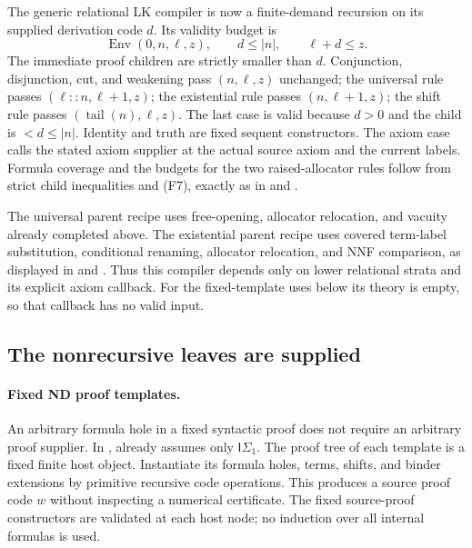The generic relational LK compiler is now a finite-demand recursion
on its supplied derivation code $d$.  Its validity budget is
\[
 \operatorname{Env}(0,n,\ell,z),\qquad d\le|n|,
 \qquad \ell+d\le z.
 \tag{F7}
\]
The immediate proof children are strictly smaller than $d$.
Conjunction, disjunction, cut, and weakening pass $(n,\ell,z)$
unchanged; the universal rule passes $(\ell::n,\ell+1,z)$;
the existential rule passes $(n,\ell+1,z)$;
the shift rule passes $(\operatorname{tail}(n),\ell,z)$.
The last case is valid because $d>0$ and the child is $<d\le|n|$.
Identity and truth are fixed sequent constructors.
The axiom case calls the stated axiom supplier at the actual source
axiom and the current labels.  Formula coverage and the budgets for
the two raised-allocator rules follow from strict child inequalities
and (F7), exactly as in
 and
.

The universal parent recipe uses free-opening, allocator relocation,
and vacuity already completed above.  The existential parent recipe
uses covered term-label substitution, conditional renaming,
allocator relocation, and NNF comparison, as displayed in
 and
.
Thus this compiler depends only on lower relational strata and its
explicit axiom callback.  For the fixed-template uses below its
theory is empty, so that callback has no valid input.

\subsection{The nonrecursive leaves are supplied}

\paragraph{Fixed ND proof templates.}
An arbitrary formula hole in a fixed syntactic proof does not require
an arbitrary proof supplier.  In
,
 already assumes only
$\mathsf I\Sigma _1$.  The proof tree of each template is a fixed
finite host object.  Instantiate its formula holes, terms, shifts,
and binder extensions by primitive recursive code operations.  This
produces a source proof code $w$ without inspecting a numerical
certificate.  The fixed source-proof constructors are validated at
each host node; no induction over all internal formulas is used.

